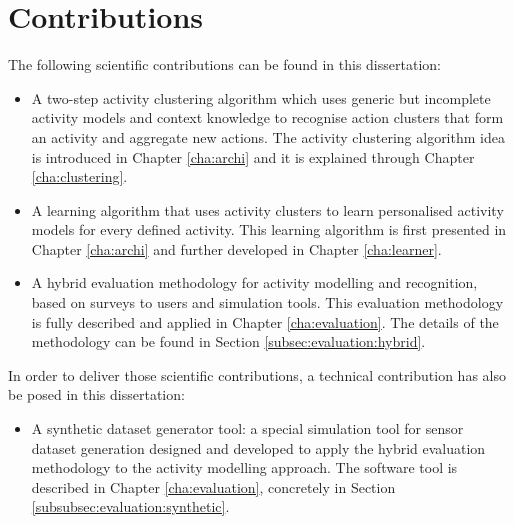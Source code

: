 \section{Contributions}
\label{sec:intro:contributions}

The following scientific contributions can be found in this dissertation:

\begin{itemize}
  \item A two-step activity clustering algorithm which uses generic but incomplete activity models and context knowledge to recognise action clusters that form an activity and aggregate new actions. The activity clustering algorithm idea is introduced in Chapter \ref{cha:archi} and it is explained through Chapter \ref{cha:clustering}.
  \item A learning algorithm that uses activity clusters to learn personalised activity models for every defined activity. This learning algorithm is first presented in Chapter \ref{cha:archi} and further developed in Chapter \ref{cha:learner}.
  \item A hybrid evaluation methodology for activity modelling and recognition, based on surveys to users and simulation tools. This evaluation methodology is fully described and applied in Chapter \ref{cha:evaluation}. The details of the methodology can be found in Section \ref{subsec:evaluation:hybrid}.
\end{itemize}

In order to deliver those scientific contributions, a technical contribution has also be posed in this dissertation:

\begin{itemize}
 \item A synthetic dataset generator tool: a special simulation tool for sensor dataset generation designed and developed to apply the hybrid evaluation methodology to the activity modelling approach. The software tool is described in Chapter \ref{cha:evaluation}, concretely in Section \ref{subsubsec:evaluation:synthetic}.
\end{itemize}
